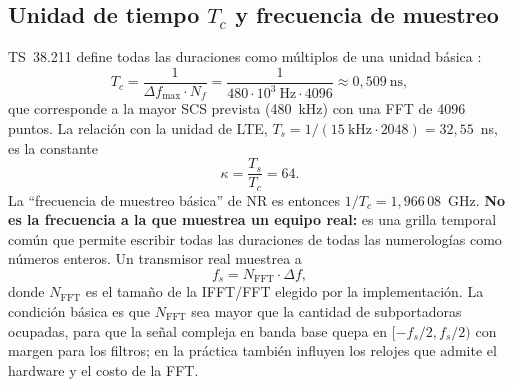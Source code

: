 \subsection{Unidad de tiempo \texorpdfstring{$T_c$}{Tc} y frecuencia de muestreo}\label{sec:fs}
TS~38.211 define todas las duraciones como múltiplos de una unidad básica \cite[§4.1]{ts38211}:
\begin{equation}
T_c = \frac{1}{\Delta f_\text{max}\cdot N_f} = \frac{1}{480\cdot 10^3~\text{Hz}\cdot 4096} \approx 0{,}509~\text{ns},
\label{eq:tc}
\end{equation}
que corresponde a la mayor SCS prevista (480~kHz) con una FFT de 4096 puntos. La relación con la unidad de LTE, $T_s = 1/(15~\text{kHz}\cdot 2048) = 32{,}55$~ns, es la constante
\begin{equation}
\kappa = \frac{T_s}{T_c} = 64.
\label{eq:kappa}
\end{equation}
La ``frecuencia de muestreo básica'' de NR es entonces $1/T_c = 1{,}966\,08$~GHz. \textbf{No es la frecuencia a la que muestrea un equipo real:} es una grilla temporal común que permite escribir todas las duraciones de todas las numerologías como números enteros. Un transmisor real muestrea a
\begin{equation}
f_s = N_\text{FFT}\cdot \Delta f,
\label{eq:fs}
\end{equation}
donde $N_\text{FFT}$ es el tamaño de la IFFT/FFT elegido por la implementación. La condición básica es que $N_\text{FFT}$ sea mayor que la cantidad de subportadoras ocupadas, para que la señal compleja en banda base quepa en $[-f_s/2, f_s/2)$ con margen para los filtros; en la práctica también influyen los relojes que admite el hardware y el costo de la FFT.

